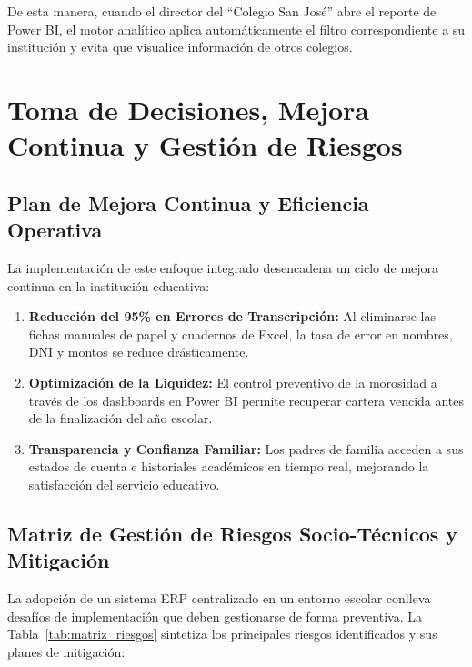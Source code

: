 \documentclass[12pt,a4paper,oneside]{report}
\begin{document}
De esta manera, cuando el director del ``Colegio San José'' abre el reporte de Power BI, el motor analítico aplica automáticamente el filtro correspondiente a su institución y evita que visualice información de otros colegios.

\chapter{Toma de Decisiones, Mejora Continua y Gestión de Riesgos}

\section{Plan de Mejora Continua y Eficiencia Operativa}

La implementación de este enfoque integrado desencadena un ciclo de mejora continua en la institución educativa:
\begin{enumerate}
    \item \textbf{Reducción del 95\% en Errores de Transcripción:} Al eliminarse las fichas manuales de papel y cuadernos de Excel, la tasa de error en nombres, DNI y montos se reduce drásticamente.
    \item \textbf{Optimización de la Liquidez:} El control preventivo de la morosidad a través de los dashboards en Power BI permite recuperar cartera vencida antes de la finalización del año escolar.
    \item \textbf{Transparencia y Confianza Familiar:} Los padres de familia acceden a sus estados de cuenta e historiales académicos en tiempo real, mejorando la satisfacción del servicio educativo.
\end{enumerate}

\section{Matriz de Gestión de Riesgos Socio-Técnicos y Mitigación}

La adopción de un sistema ERP centralizado en un entorno escolar conlleva desafíos de implementación que deben gestionarse de forma preventiva. La Tabla~\ref{tab:matriz_riesgos} sintetiza los principales riesgos identificados y sus planes de mitigación:
\end{document}
